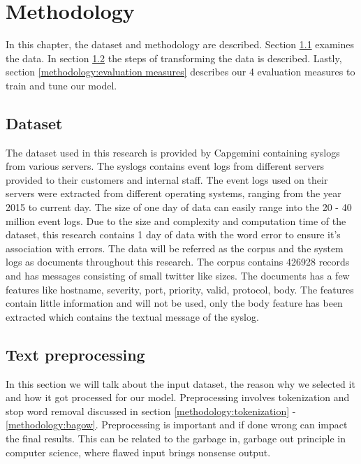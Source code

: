 \chapter{Methodology}  \label{ch:methodology}

In this chapter, the dataset and methodology are described. Section \ref{methodology:dataset} examines the data. In section \ref{methodology:Text preprocessing} the steps of transforming the data is described. Lastly, section \ref{methodology:evaluation measures} describes our 4 evaluation measures to train and tune our model.

\section{Dataset}\label{methodology:dataset}
The dataset used in this research is provided by Capgemini containing syslogs from various servers. The syslogs contains event logs from different servers provided to their customers and internal staff. The event logs used on their servers were extracted from different operating systems, ranging from the year 2015 to current day. The size of one day of data can easily range into the 20 - 40 million event logs. Due to the size and complexity and computation time of the dataset, this research contains 1 day of data with the word error to ensure it's association with errors.
The data will be referred as the corpus and the system logs as documents throughout this research. The corpus contains 426928 records and has messages consisting of small twitter like sizes. The documents has a few features like hostname, severity, port, priority, valid, protocol, body. The features contain little information and will not be used, only the body feature has been extracted which contains the textual message of the syslog.

\section{Text preprocessing}\label{methodology:Text preprocessing}
In this section we will talk about the input dataset, the reason why we selected it and how it got processed for our model. Preprocessing involves tokenization and stop word removal discussed in section \ref{methodology:tokenization} - \ref{methodology:bagow}. Preprocessing is important and if done wrong can impact the final results. This can be related to the garbage in, garbage out principle in computer science, where flawed input brings nonsense output. 


